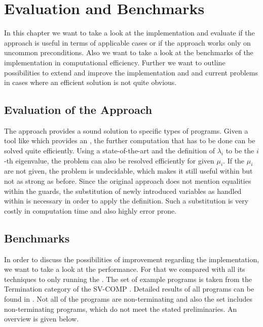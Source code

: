 \chapter{Evaluation and Benchmarks}
\label{chapter:eval}
In this chapter we want to take a look at the implementation and evaluate if the approach is useful in terms of applicable cases or if the approach works only on uncommon preconditions. \newline
Also we want to take a look at the benchmarks of the implementation in computational efficiency. \newline
Further we want to outline possibilities to extend and improve the implementation and and current problems in cases where an efficient solution is not quite obvious.

\section{Evaluation of the Approach}
The approach provides a sound solution to specific types of programs. Given a tool like \aprove which provides an \its, the further computation that has to be done can be solved quite efficiently. Using a state-of-the-art \solver and the definition of $\lambda_i$ to be the $i$-th eigenvalue, the problem can also be resolved efficiently for given $\mu_i$. If the $\mu_i$ are not given, the problem is undecidable, which makes it still useful within \aprove but not as strong as before. \newline
Since the original approach does not mention equalities within the guards, the substitution of newly introduced variables as handled within  is necessary in order to apply the definition. Such a substitution is very costly in computation time and also highly error prone.

\section{Benchmarks}
\label{sec:benchmarks}
In order to discuss the possibilities of improvement regarding the implementation, we want to take a look at the performance. For that we compared \aprove with all its techniques to \aprove only running the \gnanal. The set of example programs is taken from the Termination category of the SV-COMP \cite{SVComp}.\newline
Detailed results of all programs can be found in \cite{Benchmark}. Not all of the programs are non-terminating and also the set includes non-terminating programs, which do not meet the stated preliminaries. An overview is given below.

